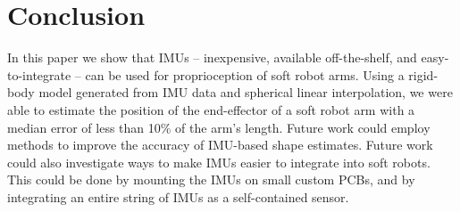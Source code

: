\section{Conclusion}    \label{sec:conclusion}

In this paper we show that IMUs -- inexpensive, available off-the-shelf, and easy-to-integrate -- can be used for proprioception of soft robot arms.
Using a rigid-body model generated from IMU data and spherical linear interpolation, we were able to estimate the position of the end-effector of a soft robot arm with a median error of less than 10\% of the arm's length.
Future work could employ methods to improve the accuracy of IMU-based shape estimates.
Future work could also investigate ways to make IMUs easier to integrate into soft robots.
This could be done by mounting the IMUs on small custom PCBs, and by integrating an entire string of IMUs as a self-contained sensor.
